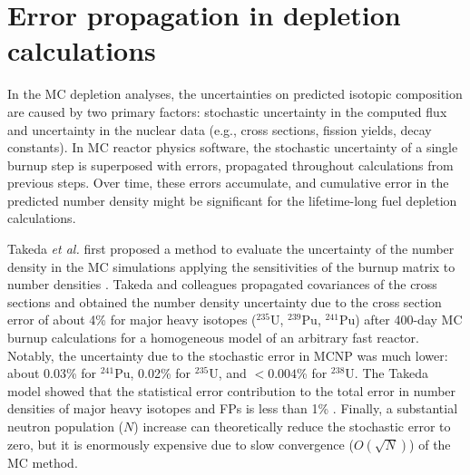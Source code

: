 \chapter{Error propagation in depletion calculations}\label{ch:uq}
In the \gls{MC} depletion analyses, the uncertainties on predicted isotopic 
composition are caused by two primary factors: stochastic uncertainty in 
the computed flux and uncertainty in the nuclear data (e.g., cross sections, 
fission yields, decay constants). In \gls{MC} reactor physics software, the 
stochastic uncertainty of a single burnup step is superposed with errors, 
propagated throughout calculations from previous steps. Over time, these 
errors accumulate, and cumulative error in the predicted number density might 
be significant for the lifetime-long fuel depletion calculations.

Takeda \emph{et al.} \cite{takeda_estimation_1999} first proposed a method to 
evaluate the uncertainty of the number density in the \gls{MC} simulations 
applying the sensitivities of the burnup matrix to number densities 
\cite{takeda_estimation_1999}. Takeda and colleagues propagated 
covariances of the cross sections and obtained the number density uncertainty 
due to the cross section error of about 4\% for major heavy isotopes 
($^{235}$U, $^{239}$Pu, $^{241}$Pu) after 400-day \gls{MC} burnup calculations 
for a homogeneous model of an arbitrary fast reactor. 
Notably, the uncertainty due to the stochastic error in MCNP 
was much lower: about 0.03\% for $^{241}$Pu, 0.02\% for $^{235}$U, and 
$<0.004$\% for $^{238}$U. The Takeda model showed that the statistical error 
contribution to the total error in number densities of major heavy isotopes 
and \glspl{FP} is less than 1\% \cite{takeda_estimation_1999}. Finally, 
a substantial neutron population ($N$) increase can theoretically reduce the 
stochastic error to zero, but it is enormously expensive due to slow 
convergence ($O(\sqrt{N})$) of the MC method.

